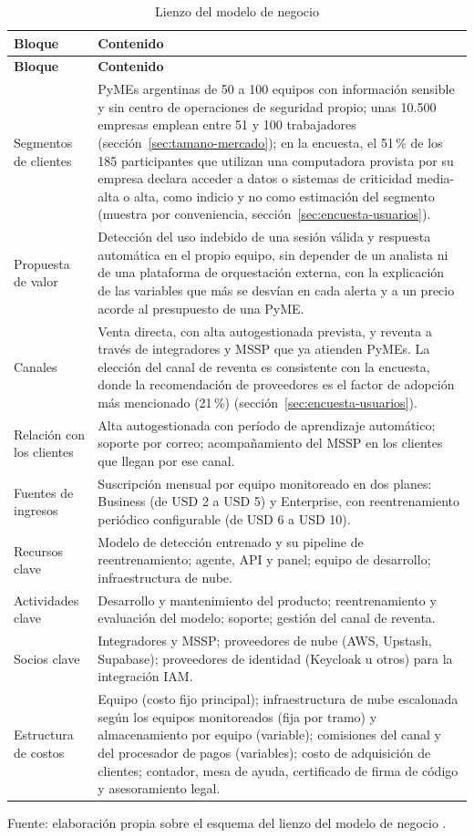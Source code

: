 \begin{longtable}{p{3.4cm}p{11cm}}
\caption{Lienzo del modelo de negocio}\label{tab:canvas}\\
\hline
\textbf{Bloque} & \textbf{Contenido} \\
\hline
\endfirsthead
\hline
\textbf{Bloque} & \textbf{Contenido} \\
\hline
\endhead
Segmentos de clientes & PyMEs argentinas de 50 a 100 equipos con información sensible y sin
centro de operaciones de seguridad propio; unas 10.500 empresas emplean entre 51 y 100 trabajadores (sección~\ref{sec:tamano-mercado}); en la encuesta, el 51\,\% de los 185 participantes que utilizan una computadora provista por su empresa declara acceder a
datos o sistemas de criticidad media-alta o alta, como indicio y no como estimación del segmento (muestra por conveniencia, sección~\ref{sec:encuesta-usuarios}). \\
Propuesta de valor & Detección del uso indebido de una sesión válida y respuesta automática en el
propio equipo, sin depender de un analista ni de una plataforma de orquestación externa, con
la explicación de las variables que más se desvían en cada alerta y a un precio acorde al presupuesto de una PyME. \\
Canales & Venta directa, con alta autogestionada prevista, y reventa a través de integradores y MSSP que ya
atienden PyMEs. La elección del canal de reventa es consistente con la encuesta, donde la
recomendación de proveedores es el factor de adopción más mencionado (21\,\%)
(sección~\ref{sec:encuesta-usuarios}). \\
Relación con los clientes & Alta autogestionada con período de aprendizaje automático;
soporte por correo; acompañamiento del MSSP en los clientes que llegan por ese canal. \\
Fuentes de ingresos & Suscripción mensual por equipo monitoreado en dos planes: Business (de USD 2 a USD 5)
y Enterprise, con reentrenamiento periódico configurable (de USD 6 a USD 10). \\
Recursos clave & Modelo de detección entrenado y su pipeline de reentrenamiento; agente, API y
panel; equipo de desarrollo; infraestructura de nube. \\
Actividades clave & Desarrollo y mantenimiento del producto; reentrenamiento y evaluación del
modelo; soporte; gestión del canal de reventa. \\
Socios clave & Integradores y MSSP; proveedores de nube (AWS, Upstash, Supabase); proveedores de
identidad (Keycloak u otros) para la integración IAM. \\
Estructura de costos & Equipo (costo fijo principal); infraestructura de nube escalonada según los equipos monitoreados (fija por tramo) y almacenamiento por
equipo (variable); comisiones del canal y del procesador de pagos (variables);
costo de adquisición de clientes; contador, mesa de ayuda, certificado de firma de código y asesoramiento legal. \\
\hline
\end{longtable}
{\small Fuente: elaboración propia sobre el esquema del lienzo del modelo de negocio \parencite{Osterwalder2010}.\par}

